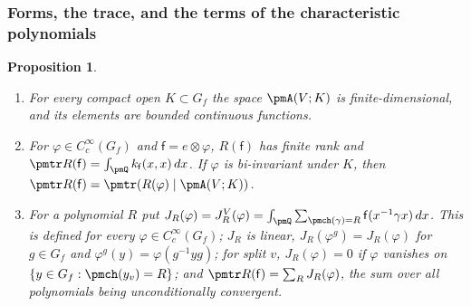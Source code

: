 \documentclass[10pt]{amsart}
\newtheorem{proposition}[theorem]{Proposition}
\theoremstyle{definition}
\theoremstyle{remark}
\begin{document}
\subsubsection{Forms, the trace, and the terms of the characteristic polynomials}\label{pm:ss-trace}

\begin{proposition}\label{pm:trace}
\begin{enumerate}
\item[(a)] For every compact open $K\subset G_f$ the space $\pmA(V;K)$ is finite-dimensional, and
its elements are bounded continuous functions.
\item[(b)] For $\varphi\in C_c^\infty(G_f)$ and $\mathsf f=e\otimes\varphi$, $R(\mathsf f)$ has finite rank and
$\pmtr R(\mathsf f)=\int_{\pmQ}k_{\mathsf f}(x,x)\,dx$. If $\varphi$ is bi-invariant under $K$, then
$\pmtr R(\mathsf f)=\pmtr(R(\varphi)\mid\pmA(V;K))$.
\item[(c)] For a polynomial $R$ put $J_R(\varphi)=J_R^V(\varphi)=\int_{\pmQ}\sum_{\pmch(\gamma)=R}
\mathsf f(x^{-1}\gamma x)\,dx$. This is defined for every $\varphi\in C_c^\infty(G_f)$; $J_R$ is linear,
$J_R(\varphi^g)=J_R(\varphi)$ for $g\in G_f$ and $\varphi^g(y)=\varphi(g^{-1}yg)$; for split $v$,
$J_R(\varphi)=0$ if $\varphi$ vanishes on $\{y\in G_f:\pmch(y_v)=R\}$; and
$\pmtr R(\mathsf f)=\sum_RJ_R(\varphi)$, the sum over all polynomials being unconditionally convergent.
\end{enumerate}
\end{proposition}
\end{document}
